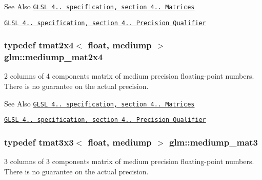 \begin{DoxySeeAlso}{See Also}
\href{http://www.opengl.org/registry/doc/GLSLangSpec.4.20.8.pdf}{\tt G\-L\-S\-L 4.. specification, section 4.. Matrices} 

\href{http://www.opengl.org/registry/doc/GLSLangSpec.4.20.8.pdf}{\tt G\-L\-S\-L 4.. specification, section 4.. Precision Qualifier} 
\end{DoxySeeAlso}
\hypertarget{group__core__precision_ga61617ba8393bbebc94ee813403aa54a9}{
\subsubsection[{mediump\-\_\-mat2x4}]{\setlength{\rightskip}{0pt plus 5cm}typedef tmat2x4$<$ float, mediump $>$ {\bf glm\-::mediump\-\_\-mat2x4}}}\label{group__core__precision_ga61617ba8393bbebc94ee813403aa54a9}
2 columns of 4 components matrix of medium precision floating-\/point numbers. There is no guarantee on the actual precision.

\begin{DoxySeeAlso}{See Also}
\href{http://www.opengl.org/registry/doc/GLSLangSpec.4.20.8.pdf}{\tt G\-L\-S\-L 4.. specification, section 4.. Matrices} 

\href{http://www.opengl.org/registry/doc/GLSLangSpec.4.20.8.pdf}{\tt G\-L\-S\-L 4.. specification, section 4.. Precision Qualifier} 
\end{DoxySeeAlso}
\hypertarget{group__core__precision_ga59f8b29bbf809530ab4c0ee97d03a4f9}{
\subsubsection[{mediump\-\_\-mat3}]{\setlength{\rightskip}{0pt plus 5cm}typedef tmat3x3$<$ float, mediump $>$ {\bf glm\-::mediump\-\_\-mat3}}}\label{group__core__precision_ga59f8b29bbf809530ab4c0ee97d03a4f9}
3 columns of 3 components matrix of medium precision floating-\/point numbers. There is no guarantee on the actual precision.

